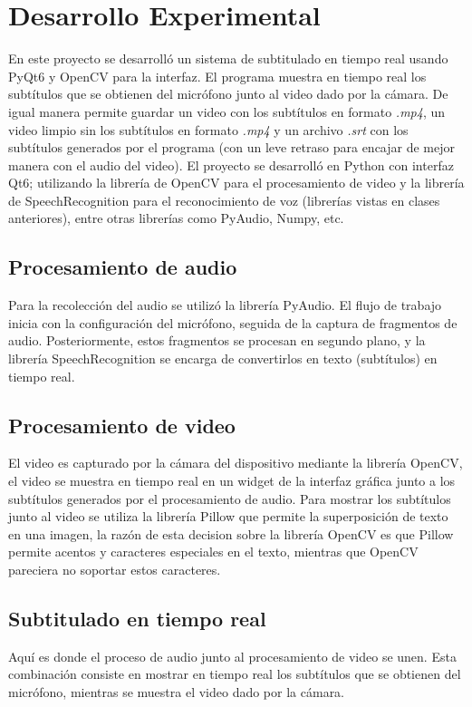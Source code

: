 \documentclass[conference]{IEEEtran}
\begin{document}
\section{Desarrollo Experimental}
En este proyecto se desarrolló un sistema de subtitulado en tiempo real usando PyQt6\cite{PyQt6} y OpenCV\cite{OpenCV} para la interfaz. El programa muestra en tiempo real los subtítulos que se obtienen del micrófono junto al video dado por la cámara. De igual manera permite guardar un video con los subtítulos en formato \textit{.mp4}, un video limpio sin los subtítulos en formato \textit{.mp4} y un archivo \textit{.srt} con los subtítulos generados por el programa (con un leve retraso para encajar de mejor manera con el audio del video). El proyecto se desarrolló en Python con interfaz Qt6; utilizando la librería de OpenCV\cite{OpenCV} para el procesamiento de video y la librería de SpeechRecognition\cite{SpeechRecognition} para el reconocimiento de voz (librerías vistas en clases anteriores), entre otras librerías como PyAudio\cite{PyAudio}, Numpy, etc.

\subsection{Procesamiento de audio}
Para la recolección del audio se utilizó la librería PyAudio. El flujo de trabajo inicia con la configuración del micrófono, seguida de la captura de fragmentos de audio. Posteriormente, estos fragmentos se procesan en segundo plano, y la librería SpeechRecognition\cite{SpeechRecognition} se encarga de convertirlos en texto (subtítulos) en tiempo real.

\subsection{Procesamiento de video}
El video es capturado por la cámara del dispositivo mediante la librería OpenCV\cite{OpenCV}, el video se muestra en tiempo real en un widget de la interfaz gráfica junto a los subtítulos generados por el procesamiento de audio. Para mostrar los subtítulos junto al video se utiliza la librería Pillow que permite la superposición de texto en una imagen, la razón de esta decision sobre la librería OpenCV es que Pillow permite acentos y caracteres especiales en el texto, mientras que OpenCV pareciera no soportar estos caracteres.

\subsection{Subtitulado en tiempo real}
Aquí es donde el proceso de audio junto al procesamiento de video se unen. Esta combinación consiste en mostrar en tiempo real los subtítulos que se obtienen del micrófono, mientras se muestra el video dado por la cámara.
\end{document}
